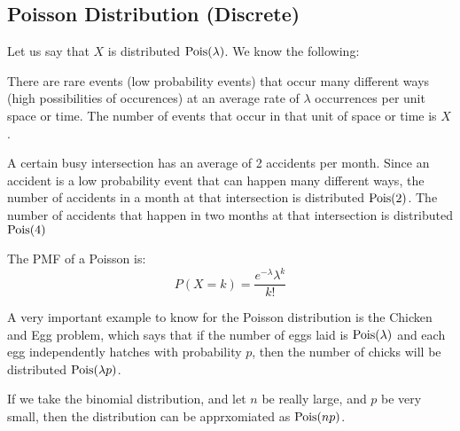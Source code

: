 \documentclass[11pt]{article}
\begin{document}
\begin{notes}
\subsection*{Poisson Distribution (Discrete)}
\begin{description}
\item Let us say that $X$ is distributed $\textrm{Pois}(\lambda)$. We know the following:
	\item[Story] There are rare events (low probability events) that occur many different ways (high possibilities of occurences) at an average rate of $\lambda$ occurrences per unit space or time. The number of events that occur in that unit of space or time is $X$.
	
	\item[Example] A certain busy intersection has an average of 2 accidents per month. Since an accident is a low probability event that can happen many different ways, the number of accidents in a month at that intersection is distributed $\textrm{Pois}(2)$. The number of accidents that happen in two months at that intersection is distributed $\textrm{Pois}(4)$
	
	\item[PMF] The PMF of a Poisson is:
\[P(X = k) = \frac{e^{-\lambda}\lambda^k}{k!}\]	
	\item[Chicken and Egg Problem] A very important example to know for the Poisson distribution is the Chicken and Egg problem, which says that if the number of eggs laid is $\textrm{Pois}(\lambda)$ and each egg independently hatches with probability $p$, then the number of chicks will be distributed $\textrm{Pois}(\lambda p)$. 
	
	\item [Limit of the Binomial] If we take the binomial distribution, and let $n$ be really large, and $p$ be very small, then the distribution can be apprxomiated as $\textrm{Pois}(np)$. 

\end{description}


\end{notes}
\end{document}

